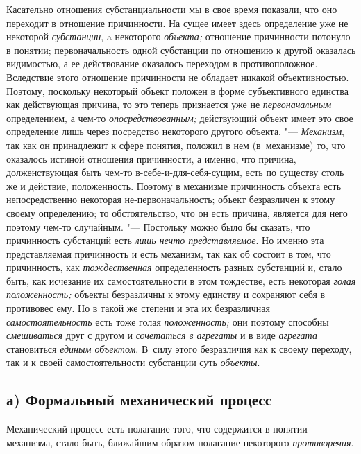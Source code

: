 Касательно отношения субстанциальности мы в свое время
показали, что оно переходит в отношение причинности. На сущее имеет здесь
определение уже не некоторой {\em субстанции}, a некоторого {\em объекта;}
отношение причинности потонуло в понятии; первоначальность
одной субстанции по отношению к другой оказалась видимостью, а ее
действование оказалось переходом в противоположное. Вследствие этого
отношение причинности не обладает никакой объективностью. Поэтому,
поскольку некоторый объект положен в форме субъективного единства как
действующая причина, то это теперь признается уже не {\em первоначальным}
определением, а чем-то {\em опосредствованным;}
действующий объект имеет это свое определение лишь через
посредство некоторого другого объекта. "--- {\em Механизм}, так как он
принадлежит к сфере понятия, положил в нем (в~механизме) то, что оказалось
истиной отношения причинности, а именно, что причина, долженствующая быть
чем-то в-себе-и-для-себя-сущим, есть по существу столь же и действие,
положенность. Поэтому в механизме причинность объекта есть непосредственно
некоторая не-первоначальность; объект безразличен к этому своему
определению; то обстоятельство, что он есть причина, является для него
поэтому чем-то случайным. "--- Постольку можно было бы сказать,
что причинность субстанций есть {\em лишь нечто представляемое}.
Но именно эта представляемая причинность и есть механизм, так
как об состоит в том, что причинность, как {\em тождественная}
определенность разных субстанций и, стало быть, как исчезание
их самостоятельности в этом тождестве, есть некоторая {\em голая положенность;}
объекты безразличны к этому единству и сохраняют себя в
противовес ему. Но в такой же степени и эта их безразличная
{\em самостоятельность} есть тоже голая {\em положенность;} они
поэтому способны {\em смешиваться} друг с другом и {\em сочетаться в агрегаты}
и в виде {\em агрегата} становиться {\em единым
объектом}. В~силу этого безразличия как к своему переходу,
так и к своей самостоятельности субстанции суть {\em объекты}.

\subsection[а) Формальный механический процесс]{а) Формальный механический процесс}

Механический процесс есть полагание того, что содержится в понятии механизма,
стало быть, ближайшим образом полагание некоторого {\em противоречия}.

